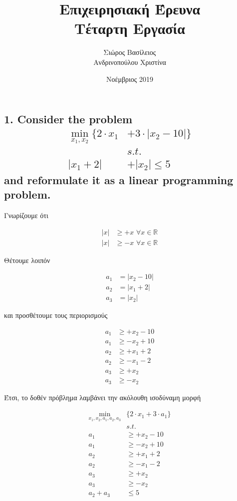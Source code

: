 \documentclass[12pt]{article}
\title{\hugeΑλγοριθμική Επιχειρησιακή Έρευνα\\Τέταρτη Εργασία}
\author{Σιώρος Βασίλειος\\Ανδρινοπούλου Χριστίνα}
\date{Νοέμβριος 2019}
\newcommand{\R}{\mathbb{R}}
\newcommand{\margin}{\hspace{4pt}}
\newcommand{\abs}[1]{\left\lvert#1\right\rvert}
\begin{document}
\maketitle


\pagebreak


\subsection*{1. Consider the problem
\begin{align*}
    \min_{x_1, x_2} \{2 \cdot x_1 & + 3 \cdot \abs{x_2 - 10}\} \\
    &s.t. \\
    \abs{x_1 + 2} & + \abs{x_2} \leq 5
\end{align*}
and reformulate it as a linear programming problem.}

Γνωρίζουμε ότι

\begin{align*}
    \abs{x} & \geq +x \margin \forall x \in \R \\
    \abs{x} & \geq -x \margin \forall x \in \R
\end{align*}

Θέτουμε λοιπόν

\begin{align*}
    a_1 & = \abs{x_2 - 10} \\
    a_2 & = \abs{x_1 + 2} \\
    a_3 & = \abs{x_2}
\end{align*}

και προσθέτουμε τους περιορισμούς

\begin{align*}
    a_1 & \geq +x_2 - 10 \\
    a_1 & \geq -x_2 + 10 \\
    a_2 & \geq +x_1 + 2 \\
    a_2 & \geq -x_1 - 2 \\
    a_3 & \geq +x_2 \\
    a_3 & \geq -x_2
\end{align*}

Έτσι, το δοθέν πρόβλημα λαμβάνει την ακόλουθη ισοδύναμη μορφή

\begin{align*}
    \min_{x_1, x_2, a_1, a_2, a_3} & \{2 \cdot x_1 + 3 \cdot a_1\} \\
    &s.t. \\
    a_1 & \geq +x_2 - 10 \\
    a_1 & \geq -x_2 + 10 \\
    a_2 & \geq +x_1 + 2 \\
    a_2 & \geq -x_1 - 2 \\
    a_3 & \geq +x_2 \\
    a_3 & \geq -x_2 \\
    a_2 + a_3 & \leq 5
\end{align*}
\end{document}
